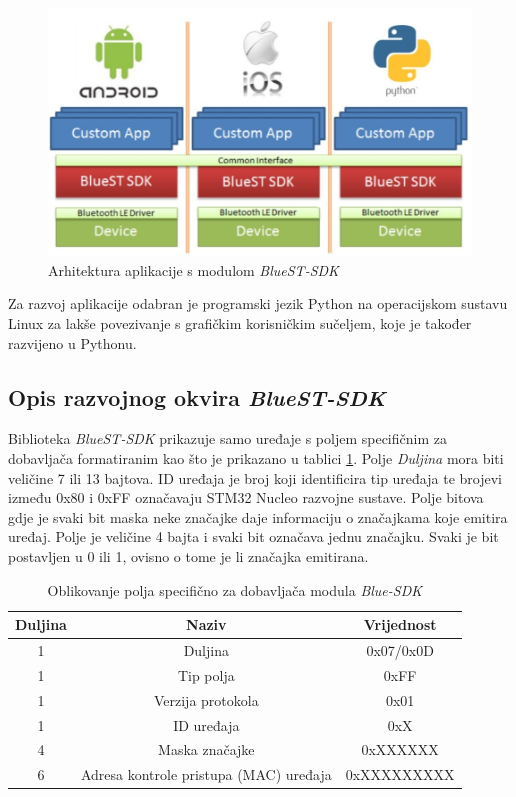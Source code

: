 \begin{figure}[ht]
	\includegraphics[width=\linewidth]{imgs/bluest_stack}
	\caption{Arhitektura aplikacije s modulom \textit{BlueST-SDK} \cite{bluest}}
	\label{fig:bluest_stack}
\end{figure}


Za razvoj aplikacije odabran je programski jezik Python na operacijskom sustavu Linux za lakše povezivanje s grafičkim korisničkim sučeljem, koje je također razvijeno u Pythonu. 

\subsection{Opis razvojnog okvira \textit{BlueST-SDK}}

Biblioteka \textit{BlueST-SDK} prikazuje samo uređaje s poljem specifičnim za dobavljača formatiranim kao što je prikazano u tablici \ref{table:formatting}. Polje \textit{Duljina} mora biti veličine 7 ili 13 bajtova. ID uređaja je broj koji identificira tip uređaja te brojevi između 0x80 i 0xFF označavaju STM32 Nucleo razvojne sustave. Polje bitova gdje je svaki bit maska neke značajke daje informaciju o značajkama koje emitira uređaj. Polje je veličine 4 bajta i svaki bit označava jednu značajku. Svaki je bit postavljen u 0 ili 1, ovisno o tome je li značajka emitirana. 

\begin{table}[ht!]
	\centering
	\caption{Oblikovanje polja specifično za dobavljača modula \textit{Blue-SDK} \cite{bluest}}
	\begin{tabular}{|c| c| c|}
		\hline
		\rowcolor{lightblue}  
		\textbf{Duljina} & \textbf{Naziv} & \textbf{Vrijednost} \\ \hline
		1 & Duljina & 0x07/0x0D \\ \hline
		1 & Tip polja & 0xFF \\ \hline
		1 & Verzija protokola & 0x01 \\ \hline
		1 & ID uređaja & 0xX \\ \hline
		4 & Maska značajke & 0xXXXXXX \\ \hline
		6 & Adresa kontrole pristupa (MAC) uređaja & 0xXXXXXXXXX \\ \hline
	\end{tabular}
	\label{table:formatting}
\end{table}

